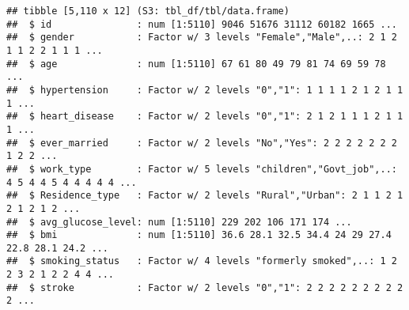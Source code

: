 \documentclass[
]{article}
\newenvironment{Shaded}{\begin{snugshade}}{\end{snugshade}}
\newcommand{\AttributeTok}[1]{\textcolor[rgb]{0.13,0.29,0.53}{#1}}
\newcommand{\CommentTok}[1]{\textcolor[rgb]{0.56,0.35,0.01}{\textit{#1}}}
\newcommand{\ConstantTok}[1]{\textcolor[rgb]{0.56,0.35,0.01}{#1}}
\newcommand{\FunctionTok}[1]{\textcolor[rgb]{0.13,0.29,0.53}{\textbf{#1}}}
\newcommand{\NormalTok}[1]{#1}
\newcommand{\OtherTok}[1]{\textcolor[rgb]{0.56,0.35,0.01}{#1}}
\newcommand{\SpecialCharTok}[1]{\textcolor[rgb]{0.81,0.36,0.00}{\textbf{#1}}}
\begin{document}
\begin{Shaded}
\end{Shaded}

\begin{verbatim}
## tibble [5,110 x 12] (S3: tbl_df/tbl/data.frame)
##  $ id               : num [1:5110] 9046 51676 31112 60182 1665 ...
##  $ gender           : Factor w/ 3 levels "Female","Male",..: 2 1 2 1 1 2 2 1 1 1 ...
##  $ age              : num [1:5110] 67 61 80 49 79 81 74 69 59 78 ...
##  $ hypertension     : Factor w/ 2 levels "0","1": 1 1 1 1 2 1 2 1 1 1 ...
##  $ heart_disease    : Factor w/ 2 levels "0","1": 2 1 2 1 1 1 2 1 1 1 ...
##  $ ever_married     : Factor w/ 2 levels "No","Yes": 2 2 2 2 2 2 2 1 2 2 ...
##  $ work_type        : Factor w/ 5 levels "children","Govt_job",..: 4 5 4 4 5 4 4 4 4 4 ...
##  $ Residence_type   : Factor w/ 2 levels "Rural","Urban": 2 1 1 2 1 2 1 2 1 2 ...
##  $ avg_glucose_level: num [1:5110] 229 202 106 171 174 ...
##  $ bmi              : num [1:5110] 36.6 28.1 32.5 34.4 24 29 27.4 22.8 28.1 24.2 ...
##  $ smoking_status   : Factor w/ 4 levels "formerly smoked",..: 1 2 2 3 2 1 2 2 4 4 ...
##  $ stroke           : Factor w/ 2 levels "0","1": 2 2 2 2 2 2 2 2 2 2 ...
\end{verbatim}
\end{document}
